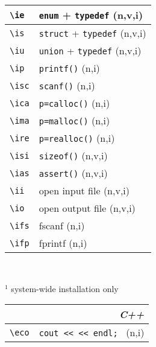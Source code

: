 \documentclass[oneside,11pt,landscape,DIV17]{scrartcl}
\begin{document}
\begin{multicols}{3}
\begin{center}
\begin{tabular}[]{|p{11mm}|p{60mm}|}
\hline \verb'\ie'  & \verb'enum'   + \verb'typedef'   \hfill (n,v,i)\\
\hline \verb'\is'  & \verb'struct' + \verb'typedef'   \hfill (n,v,i)\\
\hline \verb'\iu'  & \verb'union'  + \verb'typedef'   \hfill (n,v,i)\\
\hline \verb'\ip'  & \verb'printf()'                  \hfill (n,i)\\
\hline \verb'\isc' & \verb'scanf()'                   \hfill (n,i)\\
\hline \verb'\ica' & \verb'p=calloc()'                \hfill (n,i)\\
\hline \verb'\ima' & \verb'p=malloc()'                \hfill (n,i)\\
\hline \verb'\ire' & \verb'p=realloc()'               \hfill (n,i)\\
\hline \verb'\isi' & \verb'sizeof()'                  \hfill (n,v,i)\\
\hline \verb'\ias' & \verb'assert()'                  \hfill (n,v,i)\\
\hline \verb'\ii'  & open input file                  \hfill (n,v,i)\\
\hline \verb'\io'  & open output file                 \hfill (n,v,i)\\
\hline \verb'\ifs' & fscanf                           \hfill (n,i)\\
\hline \verb'\ifp' & fprintf                          \hfill (n,i)\\
\hline
\end{tabular}\\
%
\begin{minipage}[b]{64mm}%
\scriptsize{%
\vspace{1mm}
$^1$ {system-wide installation only}\\
}%
\end{minipage}
%
%
%
\begin{tabular}[]{|p{12mm}|p{60mm}|}
\hline
\multicolumn{2}{|r|}{\textsl{C\textbf{++}}} \\
\hline \verb'\eco'  & \verb'cout << << endl; '                \hfill (n,i)\\

\end{tabular}
\end{center}
\end{multicols}
\end{document}
